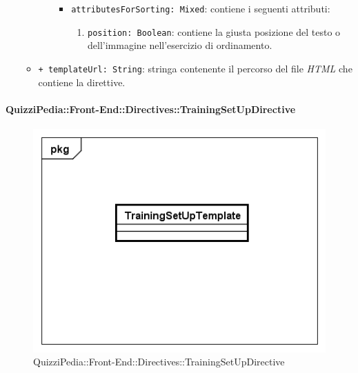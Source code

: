 \begin{itemize}
\begin{itemize}
\begin{itemize}
\begin{itemize}
						\item \texttt{attributesForSorting: Mixed}: contiene i seguenti attributi:
						\begin{enumerate}
							\item \texttt{position: Boolean}: contiene la giusta posizione del testo o dell'immagine nell'esercizio di ordinamento.
						\end{enumerate}
					\end{itemize}
				\end{itemize}
				\item \texttt{+ templateUrl: String}: stringa contenente il percorso del file \textit{HTML} che contiene la direttive.
			\end{itemize}
		\end{itemize}
		
		\paragraph{QuizziPedia::Front-End::Directives::TrainingSetUpDirective}
		
		\label{QuizziPedia::Front-End::Directives::TrainingSetUpDirective}
		
		\begin{figure}[ht]
			\centering
			\includegraphics[scale=0.5,keepaspectratio]{UML/Classi/Front-End/QuizziPedia_Front-end_Templates_TrainingSetUpTemplate.png}
			\caption{QuizziPedia::Front-End::Directives::TrainingSetUpDirective}
		\end{figure} \FloatBarrier
		
